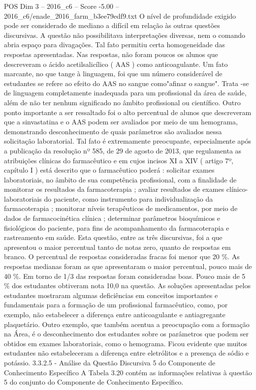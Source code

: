 \begin{textsample}{POS Dim 3 – 2016\_c6 – Score -5.00 – 2016\_c6/enade\_2016\_farm\_b3ee79edf9.txt}
O nível de profundidade exigido pode ser considerado de mediano a difícil em relação às outras questões discursivas.
A questão não possibilitava interpretações diversas, nem o comando abria espaço para divagações.
Tal fato permitiu certa homogeneidade das respostas apresentadas.
Nas respostas, não foram poucos os alunos que descreveram o ácido acetilsalicílico ( AAS ) como anticoagulante.
Um fato marcante, no que tange à linguagem, foi que um número considerável de estudantes se refere ao efeito do AAS no sangue como"afinar o sangue".
Trata -se de linguagem completamente inadequada para um profissional da área de saúde, além de não ter nenhum significado no âmbito profissional ou científico.
Outro ponto importante a ser ressaltado foi o alto percentual de alunos que descreveram que a sinvastatina e o AAS podem ser avaliados por meio de um hemograma, demonstrando desconhecimento de quais parâmetros são avaliados nessa solicitação laboratorial.
Tal fato é extremamente preocupante, especialmente após a publicação da resolução nº 585, de 29 de agosto de 2013, que regulamenta as atribuições clínicas do farmacêutico e em cujos incisos XI a XIV ( artigo 7º, capítulo I ) está descrito que o farmacêutico poderá : solicitar exames laboratoriais, no âmbito de sua competência profissional, com a finalidade de monitorar os resultados da farmacoterapia ; avaliar resultados de exames clínico-laboratoriais do paciente, como instrumento para individualização da farmacoterapia ; monitorar níveis terapêuticos de medicamentos, por meio de dados de farmacocinética clínica ; determinar parâmetros bioquímicos e fisiológicos do paciente, para fins de acompanhamento da farmacoterapia e rastreamento em saúde.
Esta questão, entre as três discursivas, foi a que apresentou o maior percentual tanto de notas zero, quanto de respostas em branco.
O percentual de respostas consideradas fracas foi menor que 20 \%.
As respostas medianas foram as que apresentaram o maior percentual, pouco mais de 40 \%.
Em torno de 1/3 das respostas foram consideradas boas.
Pouco mais de 5 \% dos estudantes obtiveram nota 10,0 na questão.
As soluções apresentadas pelos estudantes mostraram algumas deficiências em conceitos importantes e fundamentais para a formação de um profissional farmacêutico, como, por exemplo, não estabelecer a diferença entre anticoagulante e antiagregante plaquetário.
Outro exemplo, que também acentua a preocupação com a formação na Área, é o desconhecimento dos estudantes sobre os parâmetros que podem ser obtidos em exames laboratoriais, como o hemograma.
Ficou evidente que muitos estudantes não estabeleceram a diferença entre eletrólitos e a presença de sódio e potássio. 3.3.2.5 - Análise da Questão Discursiva 5 do Componente de Conhecimento Específico A Tabela 3.20 contém as informações relativas à questão 5 do conjunto do Componente de Conhecimento Específico.

\end{textsample}
